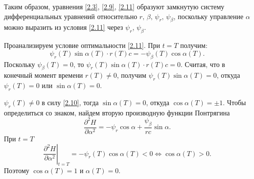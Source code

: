 \documentclass[a4paper,12pt, openany]{book}
\theoremstyle{plain} %
\theoremstyle{definition} %
\theoremstyle{remark} %
\numberwithin{equation}{chapter}
\begin{document}
{Таким образом, уравнения \eqref{2.3}, \eqref{2.9}, \eqref{2.11} образуют замкнутую систему дифференциальных уравнений относительно $r, \, \beta, \, \psi_r, \, \psi_\beta$, поскольку управление $\alpha$ можно выразить из условия \eqref{2.11} через $\psi_r$, $\psi_\beta$.  

Проанализируем условие оптимальности \eqref{2.11}. При $t = T$ получим:  
$$\psi_r(T)\sin\alpha(T) \cdot r(T) c = -\psi_\beta(T)\cos\alpha(T).$$
Поскольку $\psi_\beta(T) = 0$, то $\psi_r(T)\sin\alpha(T) \cdot r(T) c = 0$. Считая, что в конечный момент времени $r(T) \neq 0$, получим $\psi_r(T)\sin\alpha(T) = 0$, откуда $\psi_r(T) = 0$ или $\sin\alpha(T) = 0$. 

$\psi_r(T) \neq 0$ в силу \eqref{2.10}, тогда $\sin\alpha(T) = 0$, откуда $\cos\alpha(T) = \pm 1$. Чтобы определиться со знаком, найдем вторую производную функции Понтрягина 
\[
\frac{{\partial ^2 H}}{{\partial \alpha ^2 }} =  - \psi _r \cos \alpha  + \frac{{\psi _\beta  }}{{rc}}\sin \alpha .
\]
При $t = T$ 
\[
\left. {\frac{{\partial ^2 H}}{{\partial \alpha ^2 }}} \right|_{t = T}  =  - \psi _r \left( T \right)\cos \alpha \left( T \right) < 0 \Longleftrightarrow \cos \alpha \left( T \right) > 0.
\]
Поэтому $\cos\alpha(T) = 1$ и $\alpha(T) = 0$.

}
\end{document}
